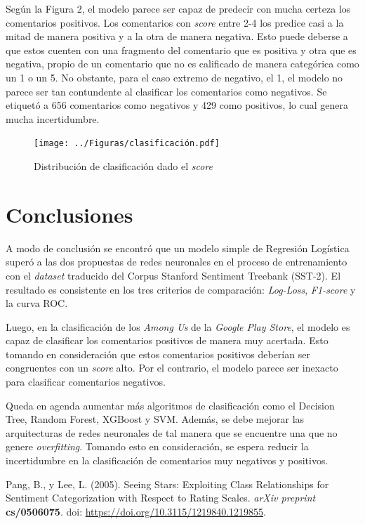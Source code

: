 Según la Figura 2, el modelo parece ser capaz de predecir con mucha certeza los comentarios positivos. Los comentarios con \textit{score} entre 2-4 los predice casi a la mitad de manera positiva y a la otra de manera negativa. Esto puede deberse a que estos cuenten con una fragmento del comentario que es positiva y otra que es negativa, propio de un comentario que no es calificado de manera categórica como un 1 o un 5. No obstante, para el caso extremo de negativo, el 1, el modelo no parece ser tan contundente al clasificar los comentarios como negativos. Se etiquetó a 656 comentarios como negativos y 429 como positivos, lo cual genera mucha incertidumbre.
\begin{figure}[h!]
	\centering
	\texttt{[image: ../Figuras/clasificación.pdf]}
	\caption{Distribución de clasificación dado el \textit{score}}
\end{figure}


\section{Conclusiones}
A modo de conclusión se encontró que un modelo simple de Regresión Logística superó a las dos propuestas de redes neuronales en el proceso de entrenamiento con el \textit{dataset} traducido del Corpus Stanford Sentiment Treebank (SST-2). El resultado es consistente en los tres criterios de comparación: \textit{Log-Loss}, \textit{F1-score} y la curva ROC. 

Luego, en la clasificación de los \textit{Among Us} de la \textit{Google Play Store}, el modelo es capaz de clasificar los comentarios positivos de manera muy acertada. Esto tomando en consideración que estos comentarios positivos deberían ser congruentes con un \textit{score} alto. Por el contrario, el modelo parece ser inexacto para clasificar comentarios negativos.

Queda en agenda aumentar más algoritmos de clasificación como el Decision Tree, Random Forest, XGBoost y SVM. Además, se debe mejorar las arquitecturas de redes neuronales de tal manera que se encuentre una que no genere \textit{overfitting}. Tomando esto en consideración, se espera reducir la incertidumbre en la clasificación de comentarios muy negativos y positivos.

\begin{thebibliography}{99}
	
\bibitem {} Pang, B., y Lee, L. (2005). Seeing Stars: Exploiting Class Relationships for Sentiment Categorization with Respect to Rating Scales. \textit{arXiv preprint} \textbf{cs/0506075}. doi: \url{https://doi.org/10.3115/1219840.1219855}.

\end{thebibliography}

